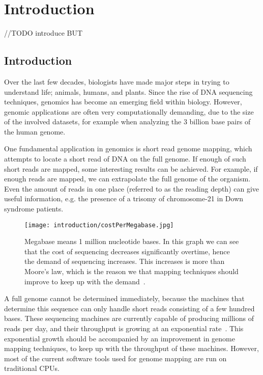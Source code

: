 
\chapter{Introduction}

//TODO introduce BUT

\section{Introduction}
Over the last few decades, biologists have made major steps in trying to understand life; animals, humans, and plants. Since the rise of DNA sequencing techniques, genomics has become an emerging field within biology. However, genomic applications are often very computationally demanding, due to the size of the involved datasets, for example when analyzing the 3 billion base pairs of the human genome.

One fundamental application in genomics is short read genome mapping, which attempts to locate a short read of DNA on the full genome. If enough of such short reads are mapped, some interesting results can be achieved. For example, if enough reads are mapped, we can extrapolate the full genome of the organism. Even the amount of reads in one place (referred to as the reading depth) can give useful information, e.g. the presence of a trisomy of chromosome-21 in Down syndrome patients.

\begin{figure}[H]
	\centering
	\texttt{[image: introduction/costPerMegabase.jpg]}
	\caption{Megabase means 1 million nucleotide bases. In this graph we can see that the cost of sequencing decreases significantly overtime, hence the demand of sequencing increases. This increases is more than Moore's law, which is the reason we that mapping techniques should improve to keep up with the demand~\cite{SeqCost}.}
	\label{fig:costMb}
\end{figure}

A full genome cannot be determined immediately, because the machines that determine this sequence can only handle short reads consisting of a few hundred bases. These sequencing machines are currently capable of producing millions of reads per day, and their throughput is growing at an exponential rate~\cite{SeqCost}. This exponential growth should be accompanied by an improvement in genome mapping techniques, to keep up with the throughput of these machines. However, most of the current software tools used for genome mapping are run on traditional CPUs. 

